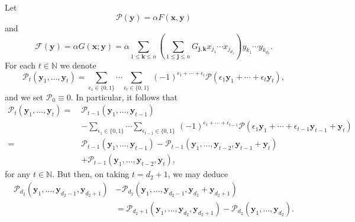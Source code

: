 \documentclass[12pt, reqno]{amsart}
\numberwithin{equation}{section}
\newcommand{\0}{\mathbf{0}}
\newcommand{\NN}{\mathbb{N}}
\renewcommand{\leq}{\leqslant}
\newcommand{\x}{\mathbf{x}}
\newcommand{\y}{\mathbf{y}}
\renewcommand{\=}{\equiv}
\newcommand{\1}{\mathbf{1}}
\theoremstyle{definition}
\begin{document}
Let
\begin{equation}
\label{defnF=g}
\mathcal{P}(\mathbf{y}) =  \alpha F( \x, \y )
\end{equation}
and
$$
\mathcal{F}(\y)
=
\alpha G(\x; \y)
= \alpha
 \sum_{1 \leq \mathbf{k} \leq n} \left( \sum_{1 \leq \mathbf{j} \leq n}
G_{\mathbf{j}, \mathbf{k}} x_{j_1} \cdots x_{j_{d_1}}   \right)  y_{k_1} \cdots y_{k_{d_2}}.
$$
For each $t \in \mathbb{N}$ we denote
$$
\mathcal{P}_{t}(\mathbf{y}_1, \ldots, \mathbf{y}_{t}) = \sum_{\epsilon_1 \in \{0, 1\} } \cdots \sum_{\epsilon_{t} \in \{0, 1\} } \,
(-1)^{\epsilon_1 + \cdots + \epsilon_{t} }
\mathcal{P}( \epsilon_1 \mathbf{y}_1 + \cdots + \epsilon_{t} \mathbf{y}_{t} ),
$$
and we set  $\mathcal{P}_0\equiv 0$.
In particular, it follows that
\begin{align*}
\mathcal{P}_{t}(\mathbf{y}_1, \ldots, \mathbf{y}_{t}) 
=~&
\mathcal{P}_{t-1}(\mathbf{y}_1, \ldots, \mathbf{y}_{t-1})\\
&-
\sum_{\epsilon_1 \in \{0, 1\} } \cdots \sum_{\epsilon_{t-1} \in \{0, 1\} } \,
(-1)^{\epsilon_1 + \cdots + \epsilon_{t-1} }
\mathcal{P}( \epsilon_1 \mathbf{y}_1 + \cdots + \epsilon_{t-1} \mathbf{y}_{t-1} + \mathbf{y}_{t} )
\\
=~&
\mathcal{P}_{t-1}(\mathbf{y}_1, \ldots, \mathbf{y}_{t-1})
-
\mathcal{P}_{t-1}(\mathbf{y}_1, \ldots,  \mathbf{y}_{t-2}, \mathbf{y}_{t-1} + \mathbf{y}_t )
\\
&
+ \mathcal{P}_{t-1}(\mathbf{y}_1, \ldots, \mathbf{y}_{t-2},  \mathbf{y}_{t}),
\end{align*}
for any $t \in \NN$.  But then, on taking $t = d_2 + 1$,  we may deduce
\begin{equation}\begin{split}
\label{relnnn}
\mathcal{P}_{d_2}(\mathbf{y}_1, \ldots, \mathbf{y}_{d_2-1}, \mathbf{y}_{d_2 + 1}) 
&- \mathcal{P}_{d_2}(\mathbf{y}_1, \ldots, \mathbf{y}_{d_2-1}, \mathbf{y}_{d_2} + \mathbf{y}_{d_2 + 1})
\\
&= \mathcal{P}_{d_2 + 1}(\mathbf{y}_1, \ldots, \mathbf{y}_{d_2}, \mathbf{y}_{d_2 + 1}) - \mathcal{P}_{d_2}(\mathbf{y}_1, \ldots, \mathbf{y}_{d_2}).
\end{split}
\end{equation}
\end{document}
